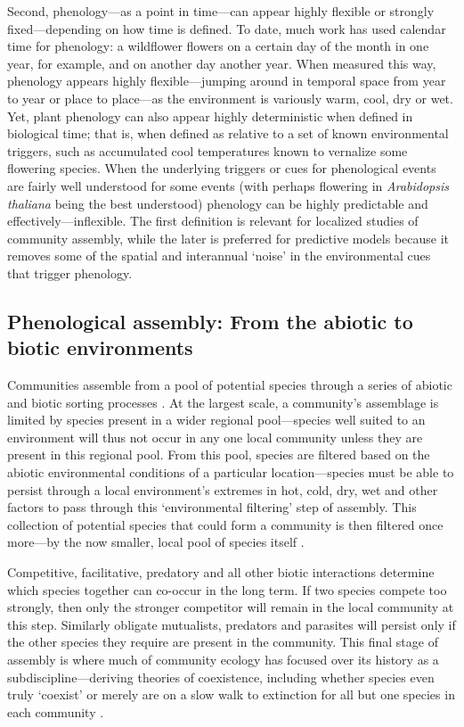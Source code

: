 \documentclass[11pt]{article}
\begin{document}
Second, phenology---as a point in time---can appear highly flexible or strongly fixed---depending on how time is defined. To date, much work has used calendar time for phenology: a wildflower flowers on a certain day of the month in one year, for example, and on another day another year. When measured this way, phenology appears highly flexible---jumping around in temporal space from year to year or place to place---as the environment is variously warm, cool, dry or wet. Yet, plant phenology can also appear highly deterministic when defined in biological time; that is, when defined as relative to a set of known environmental triggers, such as accumulated cool temperatures known to vernalize some flowering species. When the underlying triggers or cues for phenological events are fairly well understood for some events (with perhaps flowering in \emph{Arabidopsis thaliana} being the best understood) phenology can be highly predictable and effectively---inflexible. The first definition is relevant for localized studies of community assembly, while the later is preferred for predictive models because it removes some of the spatial and interannual `noise' in the environmental cues that trigger phenology.

\subsection*{Phenological assembly: From the abiotic to biotic environments} 

Communities assemble from a pool of potential species through a series of abiotic and biotic sorting processes \citep{hillerislambers2012rethinking}. At the largest scale, a community's assemblage is limited by species present in a wider regional pool---species well suited to an environment will thus not occur in any one local community unless they are present in this regional pool. From this pool, species are filtered based on the abiotic environmental conditions of a particular location---species must be able to persist through a local environment's extremes in hot, cold, dry, wet and other factors to pass through this `environmental filtering' step of assembly. This collection of potential species that could form a community is then filtered once more---by the now smaller, local pool of species itself \citep{hillerislambers2012rethinking}. 

Competitive, facilitative, predatory and all other biotic interactions determine which species together can co-occur in the long term. If two species compete too strongly, then only the stronger competitor will remain in the local community at this step. Similarly obligate mutualists, predators and parasites will persist only if the other species they require are present in the community. This final stage of assembly is where much of community ecology has focused over its history as a subdiscipline---deriving theories of coexistence, including whether species even truly `coexist' or merely are on a slow walk to extinction for all but one species in each community \citep{Hubbell:2001vo}. 
\end{document}
